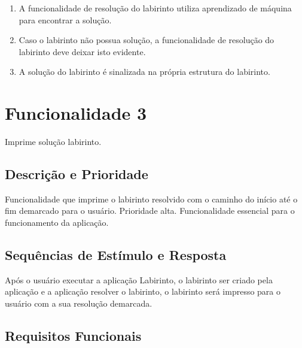 
\begin{enumerate}
    \item A funcionalidade de resolução do labirinto utiliza aprendizado de máquina para encontrar a solução.
    \item Caso o labirinto não possua solução, a funcionalidade de resolução do labirinto deve deixar isto evidente.
    \item A solução do labirinto é sinalizada na própria estrutura do labirinto.
\end{enumerate}

\section{Funcionalidade 3}

Imprime solução labirinto.

\subsection{Descrição e Prioridade}

Funcionalidade que imprime o labirinto resolvido com o caminho do início até o fim demarcado para o usuário. Prioridade alta. Funcionalidade essencial para o funcionamento da aplicação.

\subsection{Sequências de Estímulo e Resposta}
Após o usuário executar a aplicação Labirinto, o labirinto ser criado pela aplicação e a aplicação resolver o labirinto, o labirinto será impresso para o usuário com a sua resolução demarcada.

\subsection{Requisitos Funcionais}

